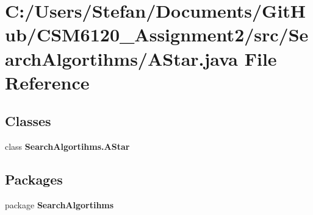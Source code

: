 \section{C\+:/\+Users/\+Stefan/\+Documents/\+Git\+Hub/\+C\+S\+M6120\+\_\+\+Assignment2/src/\+Search\+Algortihms/\+A\+Star.java File Reference}
\label{_a_star_8java}
\subsection*{Classes}
\begin{DoxyCompactItemize}
\item 
class {\bf Search\+Algortihms.\+A\+Star}
\end{DoxyCompactItemize}
\subsection*{Packages}
\begin{DoxyCompactItemize}
\item 
package {\bf Search\+Algortihms}
\end{DoxyCompactItemize}
